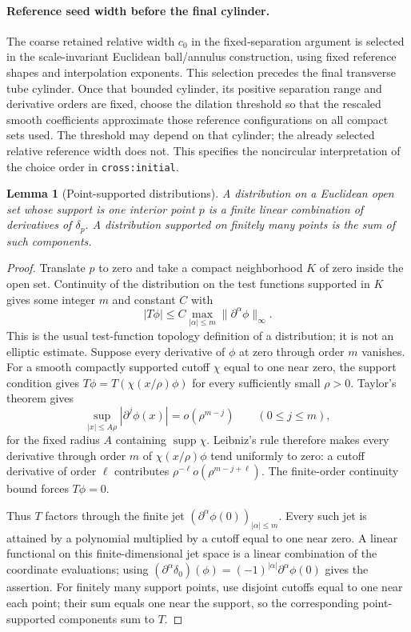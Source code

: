 \documentclass[11pt]{article}
\newtheorem{lemma}[theorem]{Lemma}
\theoremstyle{definition}
\theoremstyle{remark}
\numberwithin{equation}{section}
\begin{document}
\paragraph{Reference seed width before the final cylinder.}
The coarse retained relative width $c_0$ in the fixed-separation argument
is selected in the scale-invariant Euclidean ball/annulus construction,
using fixed reference shapes and interpolation exponents. This selection
precedes the final transverse tube cylinder. Once that bounded cylinder,
its positive separation range and derivative orders are fixed, choose the
dilation threshold so that the rescaled smooth coefficients approximate
those reference configurations on all compact sets used. The threshold
may depend on that cylinder; the already selected relative reference
width does not. This specifies the noncircular interpretation of the
choice order in \texttt{cross:initial}.

\begin{lemma}[Point-supported distributions]\label{core-repairs:point-support}
A distribution on a Euclidean open set whose support is one interior
point $p$ is a finite linear combination of derivatives of $\delta_p$.
A distribution supported on finitely many points is the sum of such
components.
\end{lemma}
\begin{proof}
Translate $p$ to zero and take a compact neighborhood $K$ of zero inside
the open set. Continuity of the distribution on the test functions
supported in $K$ gives some integer $m$ and constant $C$ with
\[
 |T\phi|\le C\max_{|\alpha|\le m}\|\partial^\alpha\phi\|_\infty.
\]
This is the usual test-function topology definition of a distribution;
it is not an elliptic estimate. Suppose every derivative of $\phi$ at zero
through order $m$ vanishes. For a smooth compactly supported cutoff
$\chi$ equal to one near zero, the support condition gives
$T\phi=T(\chi(x/\rho)\phi)$ for every sufficiently small $\rho>0$.
Taylor's theorem gives
\[
 \sup_{|x|\le A\rho}|\partial^j\phi(x)|=o(\rho^{m-j})
 \qquad(0\le j\le m),
\]
for the fixed radius $A$ containing $\operatorname{supp}\chi$.
Leibniz's rule therefore makes every derivative through order $m$ of
$\chi(x/\rho)\phi$ tend uniformly to zero: a cutoff derivative of
order $\ell$ contributes $\rho^{-\ell}o(\rho^{m-j+\ell})$.
The finite-order continuity bound forces $T\phi=0$.

Thus $T$ factors through the finite jet $(\partial^\alpha\phi(0))_{|\alpha|\le m}$.
Every such jet is attained by a polynomial multiplied by a cutoff equal
to one near zero. A linear functional on this finite-dimensional jet
space is a linear combination of the coordinate evaluations; using
$(\partial^\alpha\delta_0)(\phi)=(-1)^{|\alpha|}\partial^\alpha\phi(0)$
gives the assertion. For finitely many support points, use disjoint
cutoffs equal to one near each point; their sum equals one near the
support, so the corresponding point-supported components sum to $T$.
\end{proof}
\end{document}
